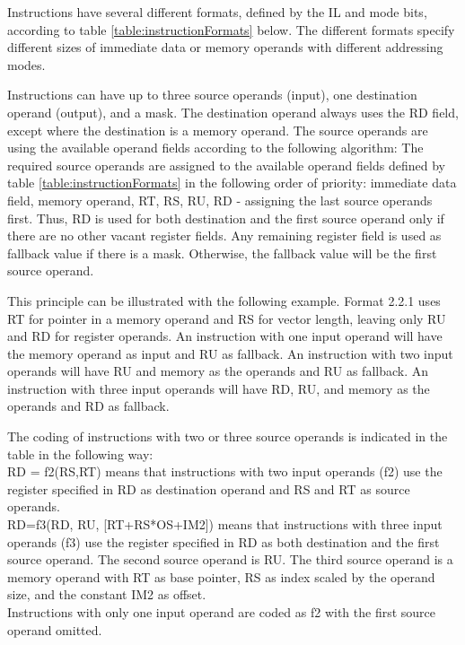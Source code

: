 \documentclass[forwardcom.tex]{subfiles}
\begin{document}
Instructions have several different formats, defined by the IL and mode bits, according to  table \ref{table:instructionFormats} below. The different formats specify different sizes of immediate data or memory operands with different addressing modes. \\
\vspace{2mm}

Instructions can have up to three source operands (input), one destination operand (output), and a mask. The destination operand always uses the RD field, except where the destination is a memory operand. The source operands are using the available operand fields according to the following algorithm: The required source operands are assigned to the available
operand fields defined by table \ref{table:instructionFormats} in the following order of 
priority: immediate data field, memory operand, RT, RS, RU, RD - assigning the last source operands first. Thus, RD is used for both destination and the first source operand only if there are no other vacant register fields. Any remaining register field is used as fallback value if there is a mask. Otherwise, the fallback value will be the first source operand.
\vspace{2mm}

This principle can be illustrated with the following example. Format 2.2.1 uses RT for pointer in a memory operand and RS for vector length, leaving only RU and RD for register operands. An instruction with one input operand will have the memory operand as input and RU as fallback. An instruction with two input operands will have RU and memory as the operands and RU as fallback. An instruction with three input operands will have RD, RU, and memory as the operands and RD as fallback.
\vspace{2mm}

The coding of instructions with two or three source operands is indicated in the table in the following way: \\
RD = f2(RS,RT)  means that instructions with two input operands (f2) use the register specified in RD as destination operand and RS and RT as source operands.\\
RD=f3(RD, RU, [RT+RS*OS+IM2])  means that instructions with three input operands (f3) use the register specified in RD as both destination and the first source operand. The second source operand is RU. The third source operand is a memory operand with RT as base pointer, RS as index scaled by the operand size, and the constant IM2 as offset.\\
Instructions with only one input operand are coded as f2 with the first source operand omitted.
\end{document}
